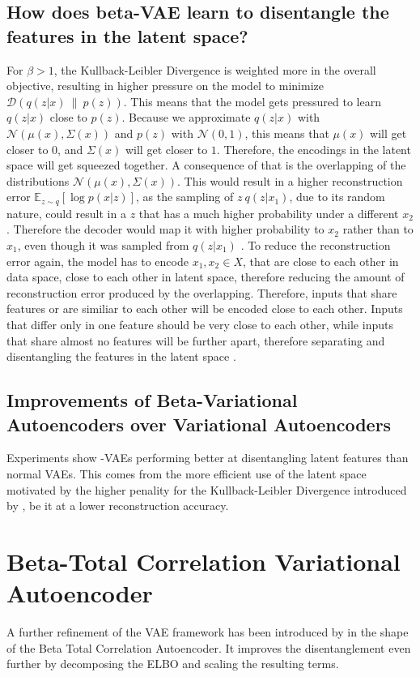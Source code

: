 \documentclass[a4paper]{IEEEtran}
\begin{document}
\subsection{How does beta-VAE learn to disentangle the features in the latent space?}
For $\beta > 1$, the Kullback-Leibler Divergence is weighted more in the overall objective, resulting in higher pressure on the model to minimize $\mathcal{D}(q(z|x) \ \| \ p(z))$. This means that the model gets pressured to learn $q(z|x)$ close to $p(z)$. Because we approximate $q(z|x)$ with $\mathcal{N}(\mu(x), \Sigma(x))$ and $p(z)$ with $\mathcal{N}(0, 1)$, this means that $\mu(x)$ will get closer to $0$, and $\Sigma(x)$ will get closer to $1$. Therefore, the encodings in the latent space will get squeezed together. A consequence of that is the overlapping of the distributions $\mathcal{N}(\mu(x), \Sigma(x))$. This would result in a higher reconstruction error $\mathbb{E}_{z \sim q}\left[ \log p(x|z) \right]$, as the sampling of $z ~ q(z|x_1)$, due to its random nature, could result in a $z$ that has a much higher probability under a different $x_2$. Therefore the decoder would map it with higher probability to $x_2$ rather than to $x_1$, even though it was sampled from $q(z|x_1)$ \cite{burgess2018understanding}. To reduce the reconstruction error again, the model has to encode $x_1, x_2 \in X$, that are close to each other in data space, close to each other in latent space, therefore reducing the amount of reconstruction error produced by the overlapping. Therefore, inputs that share features or are similiar to each other will be encoded close to each other. Inputs that differ only in one feature should be very close to each other, while inputs that share almost no features will be further apart, therefore separating and disentangling the features in the latent space \cite{burgess2018understanding}. 


\subsection{Improvements of Beta-Variational Autoencoders over Variational Autoencoders}
Experiments show \textbeta -VAEs performing better at disentangling latent features than normal VAEs. This comes from the more efficient use of the latent space motivated by the higher penality for the Kullback-Leibler Divergence introduced by \textbeta, be it at a lower reconstruction accuracy.


\section{Beta-Total Correlation Variational Autoencoder}
A further refinement of the VAE framework has been introduced by \cite{chen2019isolating} in the shape of the Beta Total Correlation Autoencoder. It improves the disentanglement even further by decomposing the ELBO and scaling the resulting terms.
\end{document}
